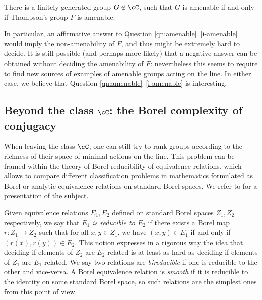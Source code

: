 \documentclass[reqno]{amsart}
\begin{document}
\begin{thmA} \label{teo:noc}
	There is a finitely generated group $G \not \in \cC$, such that $G$ is amenable if and only if Thompson's group $F$ is amenable.
\end{thmA}


In particular, an affirmative answer to Question \ref{qn:amenable}~\eqref{i-amenable} would imply the non-amenability of $F$, and thus might be extremely hard to decide. It is still possible (and perhaps more likely) that a negative answer can be obtained without deciding the amenability of $F$: nevertheless this seems to require to find new sources of examples of amenable groups acting on the line. In either case, we believe that Question \ref{qn:amenable}~\eqref{i-amenable} is interesting.




\subsection{Beyond the class $\cC$: the Borel complexity of conjugacy}

When leaving the class $\cC$, one can still try to rank groups according to the richness of their space of minimal actions on the line. This problem can be framed within the theory of Borel reducibility of equivalence relations, which allows to compare different classification problems in mathematics formulated as Borel or analytic equivalence relations on standard Borel spaces. We refer to \cite{Hjorth2000, KB} for a presentation of the subject.

Given equivalence relations $E_1, E_2$ defined on standard Borel spaces $Z_1, Z_2$ respectively, we say that \emph{$E_1$ is reducible to $E_2$} if there exists a Borel map $r \colon Z_1 \to Z_2$ such that for all $x,y \in Z_1$, we have $(x,y) \in E_1$ if and only if $(r(x), r(y)) \in E_2$. This notion expresses in a rigorous way the idea that deciding if elements of $Z_2$ are $E_2$-related is at least as hard as deciding if elements of $Z_1$ are $E_1$-related. We say two relations are \emph{bireducible} if one is reducible to the other and vice-versa. A Borel equivalence relation is \emph{smooth} if it is reducible to the identity on some standard Borel space, so such relations are the simplest ones from this point of view.
\end{document}
